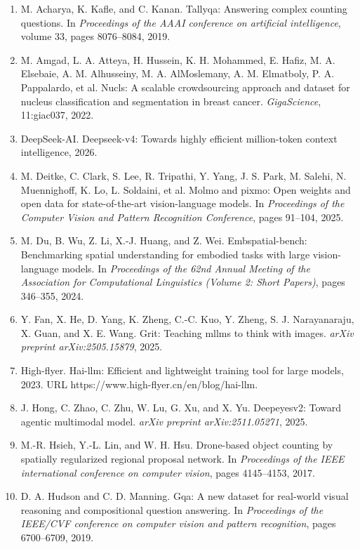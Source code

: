 \documentclass[11pt,a4paper]{article}
\begin{document}
\small
\begin{enumerate}
    \item M. Acharya, K. Kafle, and C. Kanan. Tallyqa: Answering complex counting questions. In \textit{Proceedings of the AAAI conference on artificial intelligence}, volume 33, pages 8076–8084, 2019.
    \item M. Amgad, L. A. Atteya, H. Hussein, K. H. Mohammed, E. Hafiz, M. A. Elsebaie, A. M. Alhusseiny, M. A. AlMoslemany, A. M. Elmatboly, P. A. Pappalardo, et al. Nucls: A scalable crowdsourcing approach and dataset for nucleus classification and segmentation in breast cancer. \textit{GigaScience}, 11:giac037, 2022.
    \item DeepSeek-AI. Deepseek-v4: Towards highly efficient million-token context intelligence, 2026.
    \item M. Deitke, C. Clark, S. Lee, R. Tripathi, Y. Yang, J. S. Park, M. Salehi, N. Muennighoff, K. Lo, L. Soldaini, et al. Molmo and pixmo: Open weights and open data for state-of-the-art vision-language models. In \textit{Proceedings of the Computer Vision and Pattern Recognition Conference}, pages 91–104, 2025.
    \item M. Du, B. Wu, Z. Li, X.-J. Huang, and Z. Wei. Embspatial-bench: Benchmarking spatial understanding for embodied tasks with large vision-language models. In \textit{Proceedings of the 62nd Annual Meeting of the Association for Computational Linguistics (Volume 2: Short Papers)}, pages 346–355, 2024.
    \item Y. Fan, X. He, D. Yang, K. Zheng, C.-C. Kuo, Y. Zheng, S. J. Narayanaraju, X. Guan, and X. E. Wang. Grit: Teaching mllms to think with images. \textit{arXiv preprint arXiv:2505.15879}, 2025.
    \item High-flyer. Hai-llm: Efficient and lightweight training tool for large models, 2023. URL https://www.high-flyer.cn/en/blog/hai-llm.
    \item J. Hong, C. Zhao, C. Zhu, W. Lu, G. Xu, and X. Yu. Deepeyesv2: Toward agentic multimodal model. \textit{arXiv preprint arXiv:2511.05271}, 2025.
    \item M.-R. Hsieh, Y.-L. Lin, and W. H. Hsu. Drone-based object counting by spatially regularized regional proposal network. In \textit{Proceedings of the IEEE international conference on computer vision}, pages 4145–4153, 2017.
    \item D. A. Hudson and C. D. Manning. Gqa: A new dataset for real-world visual reasoning and compositional question answering. In \textit{Proceedings of the IEEE/CVF conference on computer vision and pattern recognition}, pages 6700–6709, 2019.

\end{enumerate}
\end{document}
